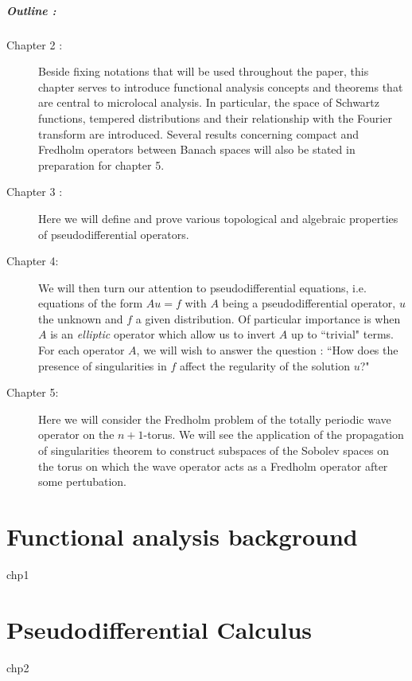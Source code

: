 \documentclass[12pt, twoside]{book}
\begin{document}
\paragraph{\Large Outline : }\hfill 
\begin{description}
    \item[Chapter 2 :] Beside fixing notations that will be used throughout the paper, this chapter serves to introduce functional analysis concepts and theorems that are central to microlocal analysis. In particular, the space of Schwartz functions, tempered distributions and their relationship with the Fourier transform are introduced. Several results concerning compact and Fredholm operators between Banach spaces will also be stated in preparation for chapter 5. 
    
    \item[Chapter 3 :] Here we will define and prove various topological and algebraic properties of pseudodifferential operators. 
    
    \item[Chapter 4: ] We will then turn our attention to pseudodifferential equations, i.e. equations of the form $Au = f$ with $A$ being a pseudodifferential operator, $u$ the unknown and $f$ a given distribution. Of particular importance is when $A$ is an \textit{elliptic} operator which allow us to invert $A$ up to ``trivial" terms. For each operator $A$, we will wish to answer the question : ``How does the presence of singularities in $f$ affect the regularity of the solution $u$?" 
    
    \item[Chapter 5: ] Here we will consider the Fredholm problem of the totally periodic wave operator on the $n + 1$-torus. We will see the application of the propagation of singularities theorem to construct subspaces of the Sobolev spaces on the torus on which the wave operator acts as a Fredholm operator after some pertubation. 
\end{description}


\chapter{Functional analysis background}
{chp1}

\chapter{Pseudodifferential Calculus}
{chp2}
\end{document}
